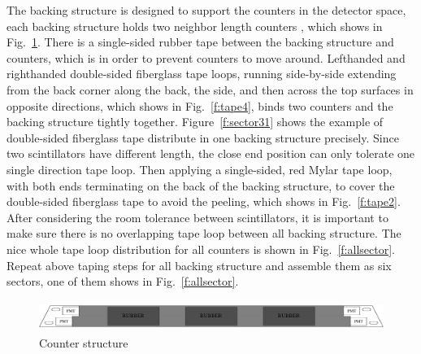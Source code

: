 The backing structure is designed to support the counters in the detector space, each backing structure holds two neighbor length counters , which shows in Fig.~\ref{f:tape-rep}. There is a single-sided rubber tape between the backing structure and counters, which is in order to prevent counters to move around. Lefthanded and righthanded double-sided fiberglass tape loops, running side-by-side extending from the back corner along the back, the side, and then across the top surfaces in opposite directions, which shows in Fig.~\ref{f:tape4}, binds two counters and the backing structure tightly together. Figure~\ref{f:sector31} shows the example of double-sided fiberglass tape distribute in one backing structure precisely. Since two scintillators have different length, the close end position can only tolerate one single direction tape loop.  Then applying a single-sided, red Mylar tape loop, with both ends terminating on the back of the backing structure, to cover the double-sided fiberglass tape to avoid the peeling, which shows in Fig.~\ref{f:tape2}. After considering the room tolerance between scintillators, it is important to make sure there is no overlapping tape loop between all backing structure. The nice whole tape loop distribution for all counters is shown in Fig.~\ref{f:allsector}. Repeat above taping steps for all backing structure and assemble them as six sectors, one of them shows in Fig.~\ref{f:allsector}.

\begin{figure}[h!]
\centerline{\includegraphics[width=15cm,height=1cm]{ye/fig_ye_construction/tape-replace.pdf}}
\caption{Counter structure}
\label{f:tape-rep}
\end{figure}

